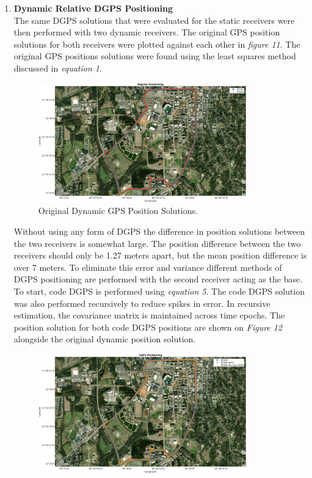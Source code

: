 \documentclass[11pt]{article}
\begin{document}
\begin{enumerate}[label=\textbf{\arabic*.}]
  \item \textbf{Dynamic Relative DGPS Positioning} \\
The same DGPS solutions that were evaluated for the static receivers were then performed with two dynamic receivers. The original GPS position solutions for both receivers were plotted against each other in \emph{figure 11}. The original GPS positions solutions were found using the least squares method discussed in \emph{equation 1}. 
    \begin{figure}[H]
        \centering
        \includegraphics[width=0.85\textwidth]{p3_a.png}
        \caption{Original Dynamic GPS Position Solutions.}
    \end{figure}
 Without using any form of DGPS the difference in position solutions between the two receivers is somewhat large. The position difference between the two receivers should only be 1.27 meters apart, but the mean position difference is over 7 meters. To eliminate this error and variance different methods of DGPS positioning are performed with the second receiver acting as the base. To start, code DGPS is performed using \emph{equation 5}. The code DGPS solution was also performed recursively to reduce spikes in error. In recursive estimation, the covariance matrix is maintained across time epochs. The position solution for both code DGPS positions are shown on \emph{Figure 12} alongside the original dynamic position solution.
  \begin{figure}[H]
        \centering
        \includegraphics[width=0.85\textwidth]{p3_b.png}

\end{figure}
\end{enumerate}
\end{document}
